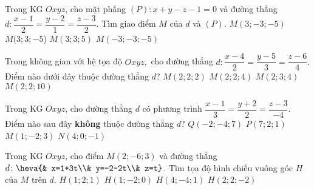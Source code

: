 	\begin{ex}%
	Trong KG $Oxyz$, cho mặt phẳng $(P): x+y-z-1=0$ và đường thẳng $d:\dfrac{x-1}{2}=\dfrac{y-2}{1}=\dfrac{z-3}{2}$. Tìm giao điểm $M$ của $d$ và $(P)$.
	\choice 
	{$M(3;-3;-5)$}
	{$M(3;3;-5$)}
	{\True $M(3;3;5)$}
	{$M(-3;-3;-5)$} 
	\end{ex} 
	\begin{ex}%
	Trong không gian với hệ tọa độ $Oxyz,$ cho đường thẳng $d:\dfrac{x-4}{2}=\dfrac{y-5}{3}=\dfrac{z-6}{4}.$ Điểm nào dưới đây thuộc đường thẳng $d$?
	\choice
	{\True $M\left(2;2;2\right)$}
	{$M\left(2;2;4\right)$}
	{$M\left(2;3;4\right)$}
	{$M\left(2;2;10\right)$}
	\end{ex}
	\begin{ex}%
	Trong KG $Oxyz$, cho đường thẳng $d$ có phương trình $\dfrac{x-1}{3}=\dfrac{y+2}{2}=\dfrac{z-3}{-4}$. Điểm nào sau đây \textbf{không} thuộc đường thẳng $d$?
	\choice
	{$Q\left(-2;-4;7\right)$}
	{\True $P\left(7;2;1\right)$}
	{$M\left(1;-2;3\right)$}
	{$N\left(4;0;-1\right)$}
	\end{ex}
	\begin{ex}%
	Trong KG $Oxyz$, cho điểm $M(2;-6;3)$ và đường thẳng $d\colon\heva{& x=1+3t\\& y=-2-2t\\& z=t}$. Tìm tọa độ hình chiếu vuông góc $H$ của $M$ trên $d$.
	\choice
	{$H(1;2;1)$}
	{$H(1;-2;0)$}
	{\True $H(4;-4;1)$}
	{$H(2;2;-2)$}
	\end{ex} 
